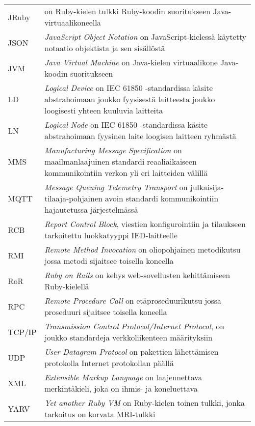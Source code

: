\begin{tabularx}{\linewidth}[h]{@{} p{} p{} @{}}
	JRuby & on Ruby-kielen tulkki Ruby-koodin suoritukseen Java-virtuaalikoneella \\
	JSON & \emph{JavaScript Object Notation} on JavaScript-kielessä käytetty notaatio objektista ja sen sisällöstä \\
	JVM & \emph{Java Virtual Machine} on Java-kielen virtuaalikone Java-koodin suoritukseen \\
	LD & \emph{Logical Device} on IEC 61850 -standardissa käsite abstrahoimaan joukko fyysisestä laitteesta joukko loogisesti yhteen kuuluvia laitteita \\
	LN & \emph{Logical Node} on IEC 61850 -standardissa käsite abstrahoimaan fyysinen laite loogisen laitteen ryhmästä \\
	MMS & \emph{Manufacturing Message Specification} on maailmanlaajuinen standardi reaaliaikaiseen kommunikointiin verkon yli eri laitteiden välillä \\
	MQTT & \emph{Message Queuing Telemetry Transport} on julkaisija-tilaaja-pohjainen avoin standardi kommunikointiin hajautetussa järjestelmässä \\
	RCB & \emph{Report Control Block}, viestien konfigurointiin ja tilaukseen tarkoitettu luokkatyyppi IED-laitteelle \\
	RMI & \emph{Remote Method Invocation} on oliopohjainen metodikutsu jossa metodi sijaitsee toisella koneella \\
	RoR & \emph{Ruby on Rails} on kehys web-sovellusten kehittämiseen Ruby-kielellä \\
	RPC & \emph{Remote Procedure Call} on etäproseduurikutsu jossa proseduuri sijaitsee toisella koneella \\
	TCP/IP & \emph{Transmission Control Protocol/Internet Protocol}, on joukko standardeja verkkoliikenteen määrityksiin \\
	UDP & \emph{User Datagram Protocol} on pakettien lähettämisen protokolla Internet protokollan päällä \\
	XML & \emph{Extensible Markup Language} on laajennettava merkintäkieli, joka on ihmis- ja koneluettava \\
	YARV & \emph{Yet another Ruby VM} on Ruby-kielen toinen tulkki, jonka tarkoitus on korvata MRI-tulkki \\
\end{tabularx}